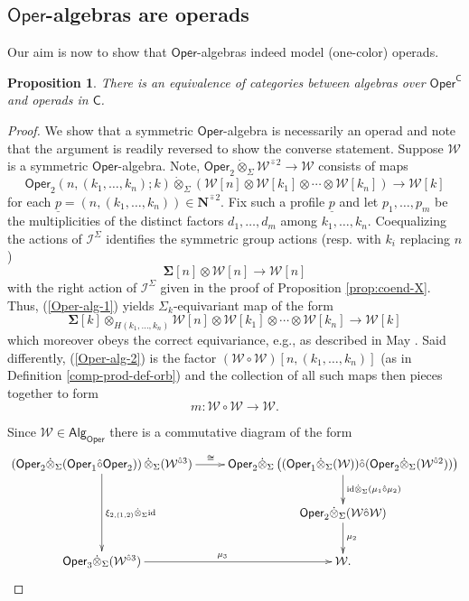 \documentclass[11pt]{amsart}
\newtheorem{proposition}[subsection]{Proposition}
\theoremstyle{definition}
\theoremstyle{remark}
\newcommand{\Alg}[1]{ {\mathsf{Alg}_{\mathcal{#1}}} }
\newcommand{\Oper}{\mathsf{Oper}}
\newcommand{\id}{\mathrm{id}}
\newcommand{\Cal}[1]{\mathcal{#1}}
\newcommand{\Ncirc}[1]{\mathbf{N}^{\hat{\circ}#1}}
\newcommand{\circhat}{\hat{\circ}}
\newcommand{\tensordot}{\dot{\otimes}}
\newcommand{\Isym}{\Cal{I}^{\Sigma}}
\begin{document}
\subsection{$\Oper$-algebras are operads}
Our aim is now to show that $\Oper$-algebras indeed model (one-color) operads. 

\begin{proposition} 
\label{Oper-is-operads}
There is an equivalence of categories between algebras over $\Oper^{\mathsf{C}}$ and operads in $\mathsf{C}$.
\end{proposition}

\begin{proof} 
We show that a symmetric $\Oper$-algebra is necessarily an operad and note that the argument is readily reversed to show the converse statement. Suppose $\Cal{W}$ is a symmetric $\Oper$-algebra. Note, $\Oper_2\tensordot_{\Sigma}  \Cal{W}^{\circhat 2}\to \Cal{W}$ consists of maps \begin{equation} \label{Oper-alg-1}
    \Oper_2 (n, (k_1,\dots,k_n);k)\tensordot_{\Sigma} \left( \Cal{W}[n] \otimes \Cal{W}[k_1] \otimes \cdots \otimes \Cal{W}[k_n]\right) \to \Cal{W}[k]
\end{equation}
for each $\underline{p}=(n,(k_1,\dots,k_n))\in\Ncirc{2}$. Fix such a profile $\underline{p}$ and let $p_1,\dots,p_m$ be the multiplicities of the distinct factors $d_1,\dots,d_m$ among $k_1,\dots,k_n$. Coequalizing the actions of $\Isym$ identifies the symmetric group actions (resp. with $k_i$ replacing $n$) \[ \mathbf{\Sigma}[n] \otimes \Cal{W}[n]\to \Cal{W}[n]\] with the right action of $\Isym$ given in the proof of Proposition \ref{prop:coend-X}. Thus, (\ref{Oper-alg-1}) yields $\Sigma_k$-equivariant map of the form\begin{equation}
\label{Oper-alg-2}
    \mathbf{\Sigma}[k] \otimes_{H(k_1,\dots,k_n)} \Cal{W}[n]\otimes \Cal{W}[k_1]\otimes \cdots \otimes \Cal{W}[k_n]\to \Cal{W}[k]
\end{equation} which moreover obeys the correct equivariance, e.g.,  as  described in May \cite{May}. Said differently, (\ref{Oper-alg-2}) is the factor $(\Cal{W}\circ \Cal{W})[n,(k_1,\dots,k_n)]$ (as in Definition \ref{comp-prod-def-orb}) and the collection of all such maps then pieces together to form \[m\colon \Cal{W}\circ \Cal{W}\to \Cal{W}.\] 

Since $\Cal{W}\in \Alg{\Oper}$ there is a commutative diagram of the form
\[ \xymatrix{
    \left( \Oper_2 \tensordot_{\Sigma}  (\Oper_1 \circhat \Oper_2) \right) \tensordot_{\Sigma}  (\Cal{W}^{\circhat 3})
    \ar[r]^<(.1){\cong} \ar[dd]^{\xi_{2,(1,2)}\tensordot_{\Sigma}  \id}
    &
    \Oper_2 \tensordot_{\Sigma}  \left( ( \Oper_1\tensordot_{\Sigma}  (\Cal{W})) \circhat (\Oper_2 \tensordot_{\Sigma}  (\Cal{W}^{\circhat 2})) \right) \ar[d]^{\id \tensordot_{\Sigma} (\mu_1\circhat \mu_2)}
    \\
    & \Oper_2 \tensordot_{\Sigma}  (\Cal{W}\circhat \Cal{W}) \ar[d]^{\mu_2}
    \\
    \Oper_3 \tensordot_{\Sigma}  (\Cal{W}^{\circhat 3}) \ar[r]^{\mu_3} & \Cal{W}. }
\] 


\end{proof}
\end{document}
